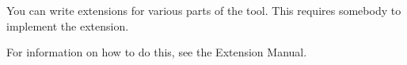 You can write extensions for various parts of the tool. This requires somebody to implement the extension.

For information on how to do this, see the Extension Manual.

